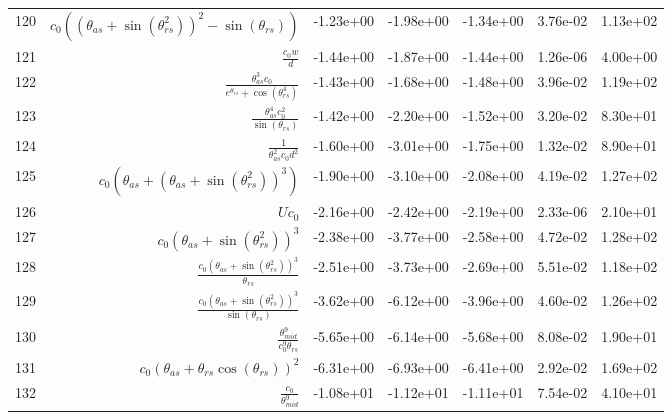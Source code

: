 \begin{tabularx}{\textwidth}{lRRRRRl}
120  &  $ c_{0} \left(\left(\theta_{as} + \sin{\left(\theta_{rs}^{2} \right)}\right)^{2} - \sin{\left(\theta_{rs} \right)}\right) $  &  -1.23e+00  &  -1.98e+00  &  -1.34e+00  &  3.76e-02  &  1.13e+02  \\ 
121  &  $ \displaystyle\frac{c_{0} w}{d} $  &  -1.44e+00  &  -1.87e+00  &  -1.44e+00  &  1.26e-06  &  4.00e+00  \\ 
122  &  $ \displaystyle\frac{\theta_{as}^{3} c_{0}}{e^{\theta_{rs}} + \cos{\left(\theta_{rs}^{4} \right)}} $  &  -1.43e+00  &  -1.68e+00  &  -1.48e+00  &  3.96e-02  &  1.19e+02  \\ 
123  &  $ \displaystyle\frac{\theta_{as}^{4} c_{0}^{2}}{\sin{\left(\theta_{rs} \right)}} $  &  -1.42e+00  &  -2.20e+00  &  -1.52e+00  &  3.20e-02  &  8.30e+01  \\ 
124  &  $ \displaystyle\frac{1}{\theta_{as}^{2} c_{0} d^{2}} $  &  -1.60e+00  &  -3.01e+00  &  -1.75e+00  &  1.32e-02  &  8.90e+01  \\ 
125  &  $ c_{0} \left(\theta_{as} + \left(\theta_{as} + \sin{\left(\theta_{rs}^{2} \right)}\right)^{3}\right) $  &  -1.90e+00  &  -3.10e+00  &  -2.08e+00  &  4.19e-02  &  1.27e+02  \\ 
126  &  $ U c_{0} $  &  -2.16e+00  &  -2.42e+00  &  -2.19e+00  &  2.33e-06  &  2.10e+01  \\ 
127  &  $ c_{0} \left(\theta_{as} + \sin{\left(\theta_{rs}^{2} \right)}\right)^{3} $  &  -2.38e+00  &  -3.77e+00  &  -2.58e+00  &  4.72e-02  &  1.28e+02  \\ 
128  &  $ \displaystyle\frac{c_{0} \left(\theta_{as} + \sin{\left(\theta_{rs}^{2} \right)}\right)^{3}}{\theta_{rs}} $  &  -2.51e+00  &  -3.73e+00  &  -2.69e+00  &  5.51e-02  &  1.18e+02  \\ 
129  &  $ \displaystyle\frac{c_{0} \left(\theta_{as} + \sin{\left(\theta_{rs}^{2} \right)}\right)^{3}}{\sin{\left(\theta_{rs} \right)}} $  &  -3.62e+00  &  -6.12e+00  &  -3.96e+00  &  4.60e-02  &  1.26e+02  \\ 
130  &  $ \displaystyle\frac{\theta_{mid}^{9}}{c_{0}^{9} \theta_{rs}} $  &  -5.65e+00  &  -6.14e+00  &  -5.68e+00  &  8.08e-02  &  1.90e+01  \\ 
131  &  $ c_{0} \left(\theta_{as} + \theta_{rs} \cos{\left(\theta_{rs} \right)}\right)^{2} $  &  -6.31e+00  &  -6.93e+00  &  -6.41e+00  &  2.92e-02  &  1.69e+02  \\ 
132  &  $ \displaystyle\frac{c_{0}}{\theta_{mid}^{9}} $  &  -1.08e+01  &  -1.12e+01  &  -1.11e+01  &  7.54e-02  &  4.10e+01  \\ 

\end{tabularx}
